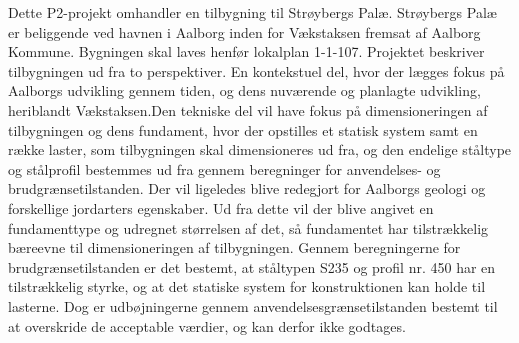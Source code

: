 Dette P2-projekt omhandler en tilbygning til Strøybergs Palæ.
\newline
Strøybergs Palæ er beliggende ved havnen i Aalborg inden for Vækstaksen fremsat af Aalborg Kommune. Bygningen skal laves henfør lokalplan 1-1-107. Projektet beskriver tilbygningen ud fra to perspektiver. En kontekstuel del, hvor der lægges fokus på Aalborgs udvikling gennem tiden, og dens nuværende og planlagte udvikling, heriblandt Vækstaksen.Den tekniske del vil have fokus på dimensioneringen af tilbygningen og dens fundament, hvor der opstilles et statisk system samt en række laster, som tilbygningen skal dimensioneres ud fra, og den endelige ståltype og stålprofil bestemmes ud fra gennem beregninger for anvendelses- og brudgrænsetilstanden. Der vil ligeledes blive redegjort for Aalborgs geologi og forskellige jordarters egenskaber. Ud fra dette vil der blive angivet en fundamenttype og udregnet størrelsen af det, så fundamentet har tilstrækkelig bæreevne til dimensioneringen af tilbygningen.
\newline
Gennem beregningerne for brudgrænsetilstanden er det bestemt, at ståltypen S235 og proﬁl nr. 450 har en tilstrækkelig styrke, og at det statiske system for konstruktionen kan holde til lasterne. Dog er udbøjningerne gennem anvendelsesgrænsetilstanden bestemt til at overskride de acceptable værdier, og kan derfor ikke godtages.

